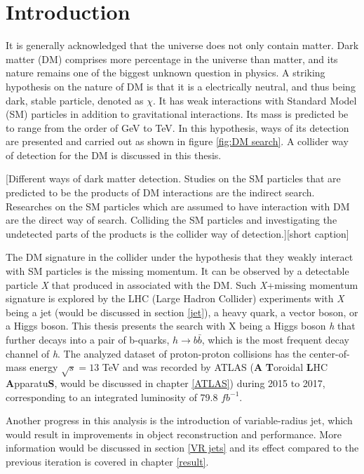 \documentclass[class=NCU_thesis, crop=false]{standalone}
\begin{document}
\chapter{Introduction}
	It is generally acknowledged that the universe does not only contain matter. Dark matter (DM) comprises more percentage in the universe than matter, and its nature remains one of the biggest unknown question in physics. A striking hypothesis on the nature of DM is that it is a electrically neutral, and thus being dark, stable particle, denoted as $\chi$. It has weak interactions with Standard Model (SM) particles in addition to gravitational interactions. Its mass is predicted be to range from the order of GeV to TeV. In this hypothesis, ways of its detection are presented and carried out as shown in figure \ref{fig:DM search}. A collider way of detection for the DM is discussed in this thesis.

	[Different ways of dark matter detection. Studies on the SM particles that are predicted to be the products of DM interactions are the indirect search. Researches on the SM particles which are assumed to have interaction with DM are the direct way of search. Colliding the SM particles and investigating the undetected parts of the products is the collider way of detection.][short caption]

	\newpage

	The DM signature in the collider under the hypothesis that they weakly interact with SM particles is the missing momentum. It can be observed by a detectable particle \textit{X} that produced in associated with the DM. Such \textit{X}+missing momentum signature is explored by the LHC (Large Hadron Collider) experiments with \textit{X} being a jet (would be discussed in section \ref{jet}), a heavy quark, a vector boson, or a Higgs boson. This thesis presents the search with X being a Higgs boson \textit{h} that further decays into a pair of b-quarks, $h \rightarrow b\bar{b}$, which is the most frequent decay channel of \textit{h}. The analyzed dataset of proton-proton collisions has the center-of-mass energy $\sqrt{s} = 13$ TeV and was recorded by ATLAS (\textbf{A} \textbf{T}oroidal \textbf{L}HC \textbf{A}pparatu\textbf{S}, would be discussed in chapter \ref{ATLAS}) during 2015 to 2017, corresponding to an integrated luminosity of 79.8 $fb^{-1}$.

	Another progress in this analysis is the introduction of variable-radius jet, which would result in improvements in object reconstruction and performance. More information would be discussed in section \ref{VR jets} and its effect compared to the previous iteration is covered in chapter \ref{result}.
	
\end{document}
